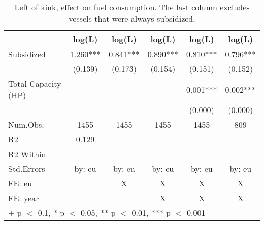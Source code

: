 \begin{table}

\caption{\label{tab:}Left of kink, effect on fuel consumption. The last column excludes vessels that were always subsidized.}
\centering
\begin{tabular}[t]{lccccc}
\toprule
  & log(L) & log(L)  & log(L)   & log(L)    & log(L)    \\
\midrule
Subsidized & \num{1.260}*** & \num{0.841}*** & \num{0.890}*** & \num{0.810}*** & \num{0.796}***\\
 & (\num{0.139}) & (\num{0.173}) & (\num{0.154}) & (\num{0.151}) & (\num{0.152})\\
Total Capacity (HP) &  &  &  & \num{0.001}*** & \num{0.002}***\\
 &  &  &  & (\num{0.000}) & (\num{0.000})\\
\midrule
Num.Obs. & \num{1455} & \num{1455} & \num{1455} & \num{1455} & \num{809}\\
R2 & \num{0.129} &  &  &  & \\
R2 Within &  &  &  &  & \\
Std.Errors & by: eu & by: eu & by: eu & by: eu & by: eu\\
FE: eu &  & X & X & X & X\\
FE: year &  &  & X & X & X\\
\bottomrule
\multicolumn{6}{l}{\rule{0pt}{1em}+ p $<$ 0.1, * p $<$ 0.05, ** p $<$ 0.01, *** p $<$ 0.001}\\
\end{tabular}
\end{table}
